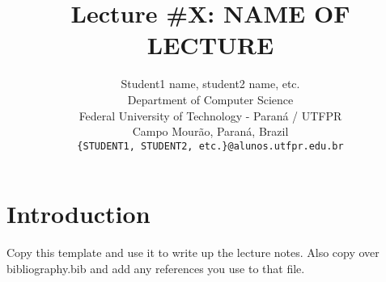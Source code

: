 \documentclass{article}
\title{Lecture \#X: NAME OF LECTURE}
\author{
  Student1 name, student2 name, etc. \\
  Department of Computer Science\\
  Federal University of Technology - Paran\'{a} / UTFPR\\
  Campo Mour\~{a}o, Paran\'{a}, Brazil \\
  \texttt{\{STUDENT1, STUDENT2, etc.\}@alunos.utfpr.edu.br} \\
}
\begin{document}
\maketitle


\section{Introduction}
Copy this template and use it to write up the lecture notes. Also copy over
bibliography.bib and add any references you use to that file.

\small


\end{document}

